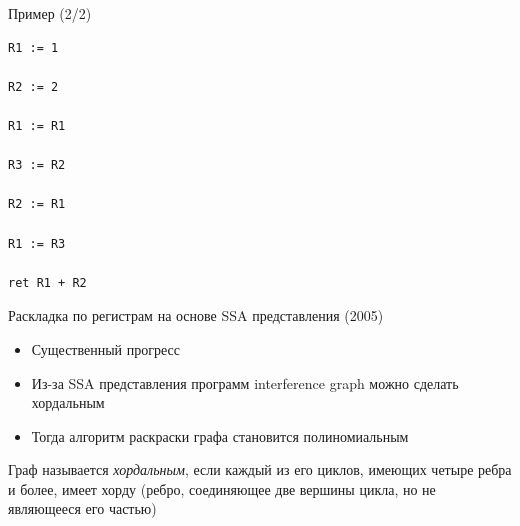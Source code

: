 \documentclass[aspectratio=169
  , xcolor={svgnames}
  , hyperref={ colorlinks,citecolor=DeepPink4
             , linkcolor=DarkRed,urlcolor=DarkBlue}
  , russian
  ]{beamer}
\theoremstyle{exerciseStyle1}
\begin{document}
\begin{frame}[fragile]{Пример (2/2)}
\begin{minipage}{.2\textwidth}
\begin{verbatim}
R1 := 1

R2 := 2

R1 := R1

R3 := R2

R2 := R1

R1 := R3

ret R1 + R2
\end{verbatim}
\end{minipage}
\end{frame}

\begin{frame}[fragile]{Раскладка по регистрам на основе SSA представления (2005)}
\begin{itemize}
\item Существенный прогресс
\item Из-за SSA представления программ interference graph можно сделать хордальным
\item Тогда алгоритм раскраски графа становится полиномиальным
\end{itemize}

\begin{definition}
Граф называется \emph{хордальным}, если каждый из его циклов, имеющих четыре ребра и более, имеет хорду (ребро, соединяющее две вершины цикла, но не являющееся его частью)
\end{definition}
\end{frame}
\end{document}
